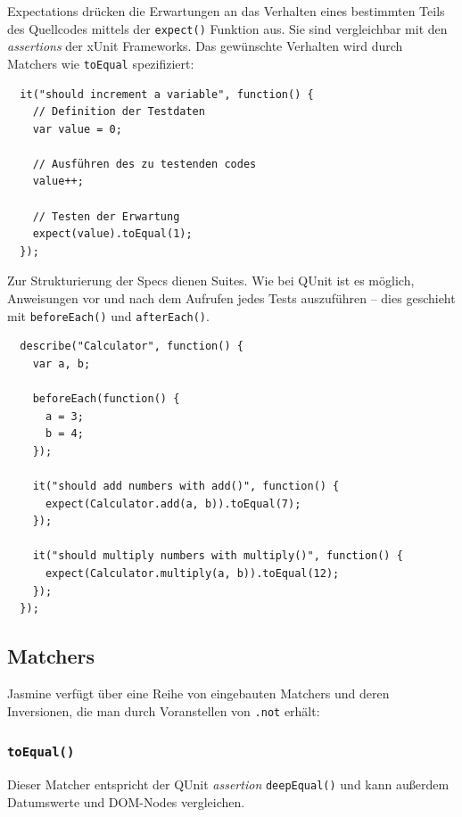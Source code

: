 \documentclass[11pt, a4paper]{article}
\begin{document}
Expectations drücken die Erwartungen an das Verhalten eines bestimmten Teils des
Quellcodes mittels der \texttt{expect()} Funktion aus. Sie sind vergleichbar mit
den \emph{assertions} der xUnit Frameworks. Das gewünschte Verhalten wird durch
Matchers wie \texttt{toEqual} spezifiziert:

\begin{verbatim}
  it("should increment a variable", function() {
    // Definition der Testdaten
    var value = 0;

    // Ausführen des zu testenden codes
    value++;

    // Testen der Erwartung
    expect(value).toEqual(1);
  });
\end{verbatim}

Zur Strukturierung der Specs dienen Suites. Wie bei QUnit ist es möglich,
Anweisungen vor und nach dem Aufrufen jedes Tests auszuführen -- dies geschieht
mit \texttt{beforeEach()} und \texttt{afterEach()}.

\begin{verbatim}
  describe("Calculator", function() {
    var a, b;

    beforeEach(function() {
      a = 3;
      b = 4;
    });

    it("should add numbers with add()", function() {
      expect(Calculator.add(a, b)).toEqual(7);
    });

    it("should multiply numbers with multiply()", function() {
      expect(Calculator.multiply(a, b)).toEqual(12);
    });
  });
\end{verbatim}

\subsection{Matchers}

Jasmine verfügt über eine Reihe von eingebauten Matchers und deren Inversionen,
die man durch Voranstellen von \texttt{.not} erhält:

\subsubsection*{\texttt{toEqual()}}

Dieser Matcher entspricht der QUnit \emph{assertion} \texttt{deepEqual()} und
kann außerdem Datumswerte und DOM-Nodes vergleichen.
\end{document}
